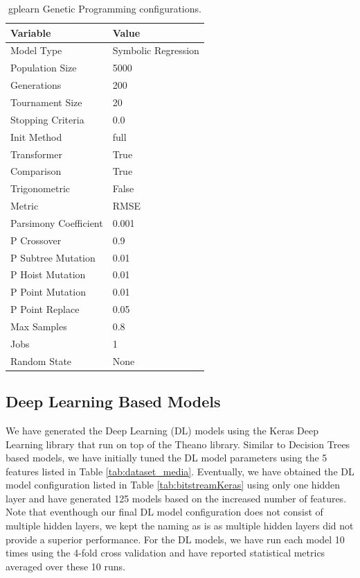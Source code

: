 \documentclass[journal]{IEEEtran}
\begin{document}
\begin{table}
\centering
\caption{gplearn Genetic Programming configurations.}
\label{tab:bitstreamgplearn}
\begin{tabular}{|l||l|} \hline
Variable & Value \\ \hline
Model Type & Symbolic Regression  \\ \hline
Population Size  & 5000  \\ \hline
Generations & 200  \\ \hline
Tournament Size & 20  \\ \hline
Stopping Criteria & 0.0  \\ \hline
Init Method & full  \\ \hline
Transformer & True  \\ \hline
Comparison & True  \\ \hline
Trigonometric & False  \\ \hline
Metric & RMSE  \\ \hline
Parsimony Coefficient & 0.001 \\ \hline
P Crossover & 0.9 \\ \hline
P Subtree Mutation & 0.01 \\ \hline
P Hoist Mutation & 0.01 \\ \hline
P Point Mutation & 0.01 \\ \hline
P Point Replace & 0.05 \\ \hline
Max Samples & 0.8 \\ \hline
Jobs & 1 \\ \hline
Random State & None \\ \hline
\end{tabular}
\end{table}

\subsection{Deep Learning Based Models}

We have generated the Deep Learning (DL) models using the Keras Deep Learning library that run on top of the Theano library. Similar to Decision Trees based models, we have initially tuned the DL model parameters using the 5 features listed in Table \ref{tab:dataset_media}. Eventually, we have obtained the DL model configuration listed in Table \ref{tab:bitstreamKeras} using only one hidden layer and have generated 125 models based on the increased number of features. Note that eventhough our final DL model configuration does not consist of multiple hidden layers, we kept the naming as is as multiple hidden layers did not provide a superior performance. For the DL models, we have run each model 10 times using the 4-fold cross validation and have reported statistical metrics averaged over these 10 runs.
\end{document}
